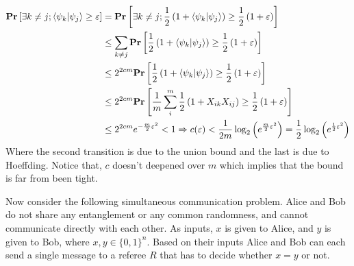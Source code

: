 \documentclass{article}
\begin{document}
\begin{enumerate}
\[ 
\begin{split}
\mathbf{Pr} \left[ \exists k \neq j ; \braket{\psi_k| \psi_j} \ge \varepsilon \right]  &= 
\mathbf{Pr} \left[ \exists k \neq j ; \frac{1}{2} \left( 1 + \braket{\psi_k| \psi_j} \right) \ge \frac{1}{2} \left( 1 + \varepsilon \right) \right]  \\
& \le \sum_{k\neq j } {\mathbf{Pr} \left[ \frac{1}{2} \left( 1 + \braket{\psi_k| \psi_j} \right) \ge \frac{1}{2} \left( 1 + \varepsilon \right) \right] } \\ 
& \le 2^{2cm} \mathbf{Pr} \left[ \frac{1}{2} \left( 1 + \braket{\psi_k| \psi_j} \right) \ge \frac{1}{2} \left( 1 + \varepsilon \right) \right] \\ 
& \le  2^{2cm}  \mathbf{Pr} \left[  \frac{1}{m}\sum_{i}^{m} \frac{1}{2} \left( 1 + X_{ik}X_{ij} \right) \ge \frac{1}{2} \left( 1 + \varepsilon \right) \right] \\
& \le 2^{2cm}e^{-\frac{m}{2}\varepsilon^2} < 1 \Rightarrow c(\varepsilon) < \frac{1}{2m} \log_{2} \left( e^{\frac{m}{2}\varepsilon^2} \right) = \frac{1}{2} \log_{2} \left( e^{\frac{1}{2}\varepsilon^2} \right)
\end{split}
\]
Where the second transition is due to the union bound and the last is due to Hoeffding. Notice that, \(c\) doesn't deepened over \(m\) which implies that the bound is far from been tight.    
\end{enumerate}
Now consider the following simultaneous communication problem. Alice and Bob do not share any entanglement or any common randomness, and cannot communicate directly with each other. As
inputs, \(x\) is given to Alice, and \(y\) is given to Bob, where \(x, y \in \{0, 1\}^n \). Based on their inputs Alice and Bob can each send a single message to a referee \(R\) that has to decide whether \(x = y\) or not.
\end{document}
